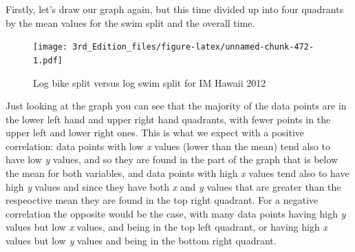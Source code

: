 \documentclass[
]{book}
\newenvironment{Shaded}{\begin{snugshade}}{\end{snugshade}}
\newcommand{\DataTypeTok}[1]{\textcolor[rgb]{0.13,0.29,0.53}{#1}}
\newcommand{\DecValTok}[1]{\textcolor[rgb]{0.00,0.00,0.81}{#1}}
\newcommand{\KeywordTok}[1]{\textcolor[rgb]{0.13,0.29,0.53}{\textbf{#1}}}
\newcommand{\NormalTok}[1]{#1}
\newcommand{\OperatorTok}[1]{\textcolor[rgb]{0.81,0.36,0.00}{\textbf{#1}}}
\newcommand{\StringTok}[1]{\textcolor[rgb]{0.31,0.60,0.02}{#1}}
\begin{document}
Firstly, let's draw our graph again, but this time divided up into four quadrants by the mean values for the swim split and the overall time.

\begin{Shaded}
\end{Shaded}

\begin{figure}
\centering
\texttt{[image: 3rd\_Edition\_files/figure-latex/unnamed-chunk-472-1.pdf]}
\caption{\label{fig:unnamed-chunk-472}Log bike split versus log swim split for IM Hawaii 2012}
\end{figure}

Just looking at the graph you can see that the majority of the data points are in the lower left hand and upper right hand quadrants, with fewer points in the upper left and lower right ones. This is what we expect with a positive correlation: data points with low \emph{x} values (lower than the mean) tend also to have low \emph{y} values, and so they are found in the part of the graph that is below the mean for both variables, and data points with high \emph{x} values tend also to have high \emph{y} values and since they have both \emph{x} and \emph{y} values that are greater than the respeoctive mean they are found in the top right quadrant. For a negative correlation the opposite would be the case, with many data points having high \emph{y} values but low \emph{x} values, and being in the top left quadrant, or having high \emph{x} values but low \emph{y} values and being in the bottom right quadrant.
\end{document}
